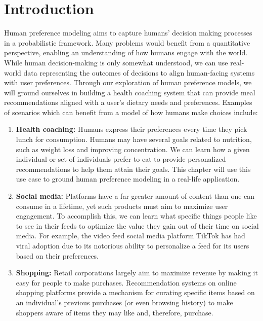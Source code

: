 \documentclass[
  letterpaper,
  DIV=11,
  numbers=noendperiod,
  oneside]{scrreprt}
\theoremstyle{remark}
\DeclareRobustCommand{\href}[2]{#2\sidenote{\footnotesize \url{#1}}}
\begin{document}
\section{Introduction}\label{introduction}

Human preference modeling aims to capture humans' decision making
processes in a probabilistic framework. Many problems would benefit from
a quantitative perspective, enabling an understanding of how humans
engage with the world. While human decision-making is only somewhat
understood, we can use real-world data representing the outcomes of
decisions to align human-facing systems with user preferences. Through
our exploration of human preference models, we will ground ourselves in
building a health coaching system that can provide meal recommendations
aligned with a user's dietary needs and preferences. Examples of
scenarios which can benefit from a model of how humans make choices
include:

\begin{enumerate}
\def\labelenumi{\arabic{enumi}.}
\item
  \textbf{Health coaching:} Humans express their preferences every time
  they pick lunch for consumption. Humans may have several goals related
  to nutrition, such as weight loss and improving concentration. We can
  learn how a given individual or set of individuals prefer to eat to
  provide personalized recommendations to help them attain their goals.
  This chapter will use this use case to ground human preference
  modeling in a real-life application.
\item
  \textbf{Social media:} Platforms have a far greater amount of content
  than one can consume in a lifetime, yet such products must aim to
  maximize user engagement. To accomplish this, we can learn what
  specific things people like to see in their feeds to optimize the
  value they gain out of their time on social media. For example, the
  video feed social media platform
  \href{https://www.tiktok.com/}{TikTok} has had viral adoption due to
  its notorious ability to personalize a feed for its users based on
  their preferences.
\item
  \textbf{Shopping:} Retail corporations largely aim to maximize revenue
  by making it easy for people to make purchases. Recommendation systems
  on online shopping platforms provide a mechanism for curating specific
  items based on an individual's previous purchases (or even browsing
  history) to make shoppers aware of items they may like and, therefore,
  purchase.
\end{enumerate}
\end{document}
